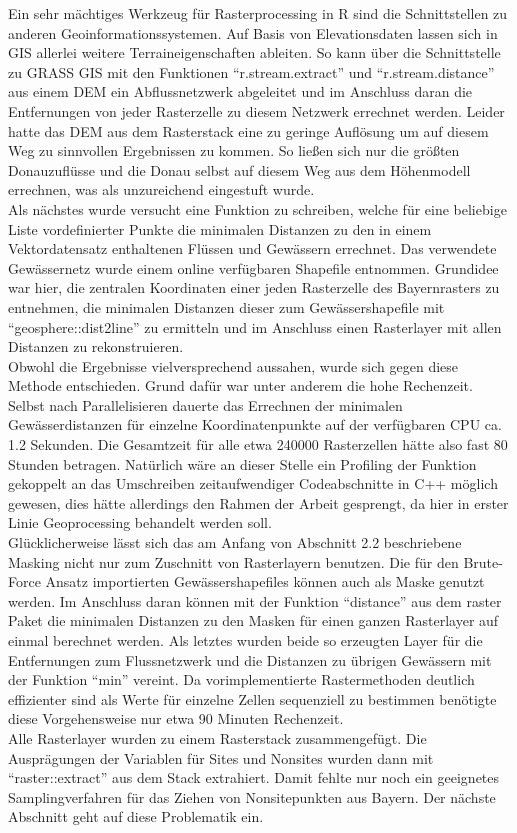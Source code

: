 Ein sehr mächtiges Werkzeug für Rasterprocessing in R sind die Schnittstellen zu anderen Geoinformationssystemen. Auf Basis von Elevationsdaten lassen sich in GIS allerlei weitere Terraineigenschaften ableiten. So kann über die Schnittstelle zu GRASS GIS mit den Funktionen ``r.stream.extract'' und ``r.stream.distance'' aus einem DEM ein Abflussnetzwerk abgeleitet und im Anschluss daran die Entfernungen von jeder Rasterzelle zu diesem Netzwerk errechnet werden. Leider hatte das DEM aus dem Rasterstack eine zu geringe Auflösung um auf diesem Weg zu sinnvollen Ergebnissen zu kommen. So ließen sich nur die größten Donauzuflüsse und die Donau selbst auf diesem Weg aus dem Höhenmodell errechnen, was als unzureichend eingestuft wurde. \\
Als nächstes wurde versucht eine Funktion zu schreiben, welche für eine beliebige Liste vordefinierter Punkte die minimalen Distanzen zu den in einem Vektordatensatz enthaltenen Flüssen und Gewässern errechnet. Das verwendete Gewässernetz wurde einem online verfügbaren Shapefile entnommen. \cite{rivershapes} Grundidee war hier, die zentralen Koordinaten einer jeden Rasterzelle des Bayernrasters zu entnehmen, die minimalen Distanzen dieser zum Gewässershapefile mit ``geosphere::dist2line'' \cite{dist2line} zu ermitteln und im Anschluss einen Rasterlayer mit allen Distanzen zu rekonstruieren. \\ Obwohl die Ergebnisse vielversprechend aussahen, wurde sich gegen diese Methode entschieden. Grund dafür war unter anderem die hohe Rechenzeit. Selbst nach Parallelisieren dauerte das Errechnen der minimalen Gewässerdistanzen für einzelne Koordinatenpunkte auf der verfügbaren CPU ca. 1.2 Sekunden. Die Gesamtzeit für alle etwa 240000 Rasterzellen hätte also fast 80 Stunden betragen. Natürlich wäre an dieser Stelle ein Profiling der Funktion gekoppelt an das Umschreiben zeitaufwendiger Codeabschnitte in C++ möglich gewesen, dies hätte allerdings den Rahmen der Arbeit gesprengt, da hier in erster Linie Geoprocessing behandelt werden soll. \\
Glücklicherweise lässt sich das am Anfang von Abschnitt 2.2 beschriebene Masking nicht nur zum Zuschnitt von Rasterlayern benutzen. Die für den Brute-Force Ansatz importierten Gewässershapefiles können auch als Maske genutzt werden. Im Anschluss daran können mit der Funktion ``distance'' aus dem raster Paket die minimalen Distanzen zu den Masken für einen ganzen Rasterlayer auf einmal berechnet werden. Als letztes wurden beide so erzeugten Layer für die Entfernungen zum Flussnetzwerk und die Distanzen zu übrigen Gewässern mit der Funktion ``min'' vereint. Da vorimplementierte Rastermethoden deutlich effizienter sind als Werte für einzelne Zellen sequenziell zu bestimmen benötigte diese Vorgehensweise nur etwa 90 Minuten Rechenzeit. \\
Alle Rasterlayer wurden zu einem Rasterstack zusammengefügt. Die Ausprägungen der Variablen für Sites und Nonsites wurden dann mit ``raster::extract'' \cite{extract} aus dem Stack extrahiert. Damit fehlte nur noch ein geeignetes Samplingverfahren für das Ziehen von Nonsitepunkten aus Bayern. Der nächste Abschnitt geht auf diese Problematik ein. 

